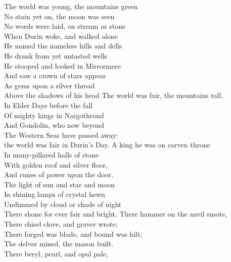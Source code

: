 \begin{flushleft}
The world was young, the mountains green \\
No stain yet on, the moon was seen \\
No words were laid, on stream or stone \\
When Durin woke, and walked alone \\
\hop
He named the nameless hills and dells \\
He drank from yet untasted wells \\
He stooped and looked in Mirrormere \\
And saw a crown of stars appear \\
As gems upon a silver thread \tab{}\\
Above the shadows of his head 
\hops
The world was fair, the mountains tall, \\
In Elder Days before the fall \tab{}\\
Of mighty kings in Nargothrond \\
And Gondolin, who now beyond \\
The Western Seas have passed away: \\
the world was fair in Durin's Day. 
\hops
{}
A king he was on carven throne \\
In many-pillared halls of stone \tab{}\\
With golden roof and silver floor, \\
And runes of power upon the door. \\
The light of sun and star and moon \\
In shining lamps of crystal hewn \\
Undimmed by cloud or shade of night \\
There shone for ever fair and bright. 
\hops
There hammer on the anvil smote, \\
There chisel clove, and graver wrote; \\
There forged was blade, and bound was hilt; \\
The delver mined, the mason built. \\
There beryl, pearl, and opal pale, \\

\end{flushleft}
